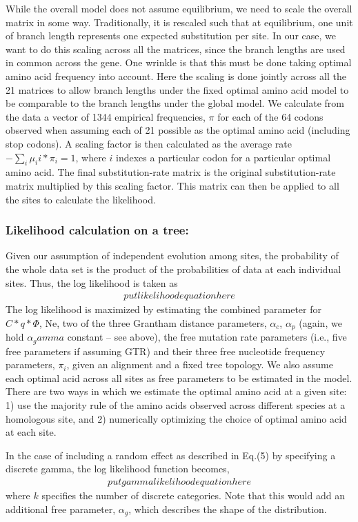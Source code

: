 \documentclass{article}
\begin{document}
While the overall model does not assume equilibrium, we need to scale the overall matrix in some way.
Traditionally, it is rescaled such that at equilibrium, one unit of branch length represents one expected substitution per site.
In our case, we want to do this scaling across all the matrices, since the branch lengths are used in common across the gene.
One wrinkle is that this must be done taking optimal amino acid frequency into account. 
Here the scaling is done jointly across all the 21 matrices to allow branch lengths under the fixed optimal amino acid model to be comparable to the branch lengths under the global model.
We calculate from the data a vector of 1344 empirical frequencies, $\pi$ for each of the 64 codons observed when assuming each of 21 possible as the optimal amino acid (including stop codons).
A scaling factor is then calculated as the average rate $-\sum_i{} \mu_ii*\pi_i=1$, where $i$ indexes a particular codon for a particular optimal amino acid.
The final substitution-rate matrix is the original substitution-rate matrix multiplied by this scaling factor.
This matrix can then be applied to all the sites to calculate the likelihood. 

\subsubsection*{Likelihood calculation on a tree: }
Given our assumption of independent evolution among sites, the probability of the whole data set is the product of the probabilities of data at each individual sites.
Thus, the log likelihood is taken as 
\begin{align*}
put likelihood equation here
\end{align*}
The log likelihood is maximized by estimating the combined parameter for $C*q*\Phi$, Ne, two of the three Grantham distance parameters, $\alpha_c$, $\alpha_p$ (again, we hold $\alpha_gamma$ constant -- see above), the free mutation rate parameters (i.e., five free parameters if assuming GTR) and their three free nucleotide frequency parameters, $\pi_i$, given an alignment and a fixed tree topology.
We also assume each optimal acid across all sites as free parameters to be estimated in the model.
There are two ways in which we estimate the optimal amino acid at a given site: 1) use the majority rule of the amino acids observed across different species at a homologous site, and 2) numerically optimizing the choice of optimal amino acid at each site. 

In the case of including a random effect as described in Eq.(5) by specifying a discrete gamma, the log likelihood function becomes,
\begin{align*}
put gamma likelihood equation here
\end{align*}
where $k$ specifies the number of discrete categories.
Note that this would add an additional free parameter, $\alpha_g$, which describes the shape of the distribution.
\end{document}
